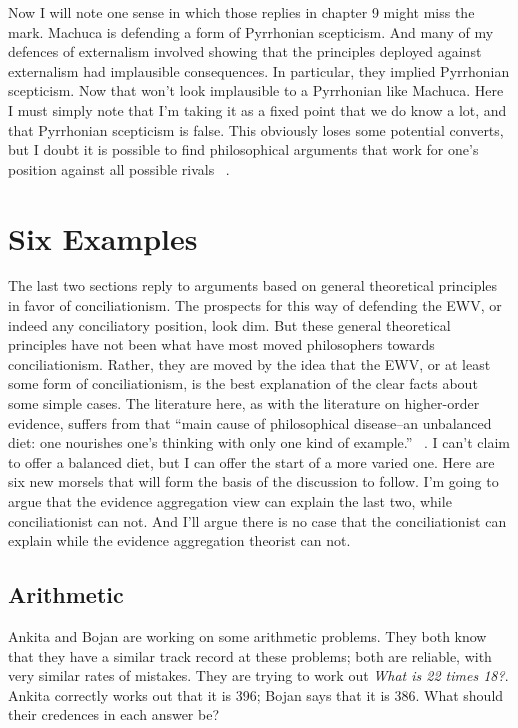 Now I will note one sense in which those replies in chapter 9 might miss the mark. Machuca is defending a form of Pyrrhonian scepticism. And many of my defences of externalism involved showing that the principles deployed against externalism had implausible consequences. In particular, they implied Pyrrhonian scepticism. Now that won't look implausible to a Pyrrhonian like Machuca. Here I must simply note that I'm taking it as a fixed point that we do know a lot, and that Pyrrhonian scepticism is false. This obviously loses some potential converts, but I doubt it is possible to find philosophical arguments that work for one's position against all possible rivals ~\citep{Lewis1982c}.

\section{Six Examples}
\label{sixexamples}

The last two sections reply to arguments based on general theoretical principles in favor of conciliationism. The prospects for this way of defending the EWV, or indeed any conciliatory position, look dim. But these general theoretical principles have not been what have most moved philosophers towards conciliationism. Rather, they are moved by the idea that the EWV, or at least some form of conciliationism, is the best explanation of the clear facts about some simple cases. The literature here, as with the literature on higher-order evidence, suffers from that ``main cause of philosophical disease--an unbalanced diet: one nourishes one's thinking with only one kind of example.'' ~\citep[§593]{Wittgenstein1953}. I can't claim to offer a balanced diet, but I can offer the start of a more varied one. Here are six new morsels that will form the basis of the discussion to follow. I'm going to argue that the evidence aggregation view can explain the last two, while conciliationist can not. And I'll argue there is no case that the conciliationist can explain while the evidence aggregation theorist can not.

\subsection{Arithmetic}
\label{arithmetic}

\gls{Ankita} and \gls{Bojan} are working on some arithmetic problems. They both know that they have a similar track record at these problems; both are reliable, with very similar rates of mistakes. They are trying to work out \emph{What is 22 times 18?}. \gls{Ankita} correctly works out that it is 396; \gls{Bojan} says that it is 386. What should their credences in each answer be?

